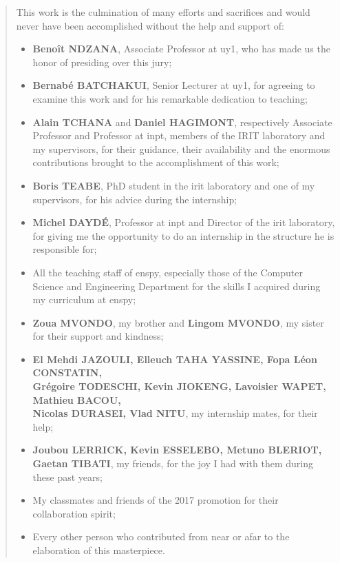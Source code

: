 \begin{SingleSpace}
\begin{quote}
This work is the culmination of many efforts and sacrifices and would never have been accomplished without the help and support of:

\begin{itemize}
	\item \textbf{Beno\^{i}t NDZANA}, Associate Professor at \acrshort{uy1}, who has made us the honor of presiding over this jury;
    \item \textbf{Bernab\'{e} BATCHAKUI}, Senior Lecturer at \acrshort{uy1}, for agreeing to examine this work and for his remarkable dedication to teaching;
    \item \textbf{Alain TCHANA} and \textbf{Daniel HAGIMONT}, respectively Associate Professor and Professor at \acrshort{inpt}, members of the IRIT laboratory and my  supervisors, for their guidance, their availability and the enormous contributions brought to the accomplishment of this work;
	\item \textbf{Boris TEABE}, PhD student in the \acrshort{irit} laboratory and one of my supervisors, for his advice during the internship;
	\item \textbf{Michel DAYD\'{E}}, Professor at \acrshort{inpt} and Director of the \acrshort{irit} laboratory, for giving me the opportunity to do an internship in the structure he is responsible for;
    \item All the teaching staff of \acrshort{enspy}, especially those of the Computer Science and Engineering Department for the skills I acquired during my curriculum at \acrshort{enspy};
    \item \textbf{Zoua MVONDO}, my brother and \textbf{Lingom MVONDO}, my sister for their support and kindness; 
    \item \textbf{El Mehdi JAZOULI, Elleuch TAHA YASSINE, Fopa L\'{e}on CONSTATIN, \\ Gr\'{e}goire TODESCHI, Kevin JIOKENG, Lavoisier WAPET, Mathieu BACOU,\\ Nicolas DURASEI, Vlad NITU}, my internship mates, for their help;
    \item \textbf{Joubou LERRICK, Kevin ESSELEBO, Metuno BLERIOT, Gaetan TIBATI}, my friends, for the joy I had with them during these past years;
    \item My classmates and friends of the 2017 promotion for their collaboration spirit;
    \item Every other person who contributed from near or afar to the elaboration of this masterpiece.

    
\end{itemize}

\end{quote}
\end{SingleSpace}
\clearpage
